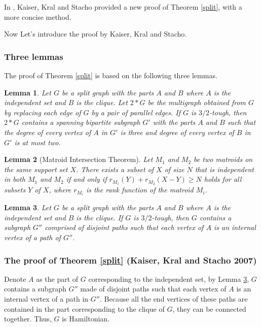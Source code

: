 \documentclass[12pt]{report}
\newtheorem{lemma}{Lemma}
\begin{document}
In \cite{kaiser2007tough}, Kaiser, Kral and Stacho provided a new proof of Theorem \ref{split}, with a more concise method.

Now Let's introduce the proof by Kaiser, Kral and Stacho.
\subsubsection{Three lemmas}
The proof of Theorem \ref{split} is based on the following three lemmas.
\begin{lemma}\label{s1}{\cite[Lemma 1.]{kaiser2007tough}}
Let $G$ be a split graph with the parts $A$ and $B$ where $A$ is the independent set and $B$ is the clique. Let $2*G$ be the multigraph obtained from $G$ by replacing each edge of $G$ by a pair of parallel edges. If $G$ is $3/2$-tough, then $2*G$ contains a spanning bipartite subgraph $G'$ with the parts $A$ and $B$ such that the degree of every vertex of $A$ in $G'$ is three and degree of every vertex of $B$ in $G'$ is at most two.

\end{lemma}


\begin{lemma}[Matroid Intersection Theorem]\label{matroid}
Let $M_1$ and $M_2$ be two matroids on the same support set $X$. There exists a subset of $X$ of size $N$ that is independent in both $M_1$ and $M_2$ if and only if $r_{M_1}(Y)+r_{M_2}(X-Y)\ge N$ holds for all subsets $Y$ of $X$, where $r_{M_i}$ is the rank function of the matroid $M_i$.
\end{lemma}

\begin{lemma}\label{s2}{\cite[Lemma 2.]{kaiser2007tough}}
Let $G$ be a split graph with the parts $A$ and $B$ where $A$ is the independent set and $B$ is the clique. If $G$ is $3/2$-tough, then $G$ contains a subgraph $G''$ comprised of disjoint paths such that each vertex of $A$ is an internal vertex of a path of $G''$.
\end{lemma}

\subsubsection{The proof of Theorem \ref{split} (Kaiser, Kral and Stacho 2007)}
Denote $A$ as the part of $G$ corresponding to the independent set, by Lemma \ref{s2}, $G$ contains a subgraph $G''$ made of disjoint paths such that each vertex of $A$ is an internal vertex of a path in  $G''$. Because all the end vertices of these paths are contained in the part corresponding to the clique of $G$, they can be connected together. Thus, $G$ is Hamiltonian.
\end{document}
